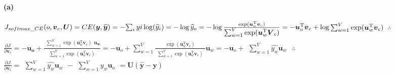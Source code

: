 \documentclass{article}
\begin{document}
\begin{spacing}{1.5}
\paragraph{(a)} 
$ J_{softmax\_CE}(o,\boldsymbol{v}_c,\boldsymbol{U})=CE(\boldsymbol{y},\boldsymbol{\widehat{y}})=-\begin{matrix} \sum_{i}y{i}\log(\widehat{y}_i)\end{matrix}=-\log\widehat{y}_o 
=-\log \frac{\exp(\boldsymbol{u}_o ^\mathrm{T}\boldsymbol{v}_c)}{\begin{matrix} \sum_{w=1}^V\exp(\boldsymbol{u}_w ^\mathrm{T}\boldsymbol{V}_c) \end{matrix}} \\
=-\boldsymbol{u}_o ^\mathrm{T}\boldsymbol{v}_c+\log \begin{matrix} \sum_{w=1}^V\exp(\boldsymbol{u}_w ^\mathrm{T}\boldsymbol{v}_c) \end{matrix} $ \newline
$ \boldsymbol{\therefore} $
$ \frac {\partial J}{\partial \boldsymbol{v}_c}=-\boldsymbol{u_o}+\frac{\begin{matrix} \sum_{w=1}^V\exp(\boldsymbol{u}_w ^\mathrm{T}\boldsymbol{v}_c) \end{matrix} \boldsymbol{u_w}}{\begin{matrix} \sum_{w=1}^V\exp(\boldsymbol{u}_w ^\mathrm{T}\boldsymbol{v}_c) \end{matrix}}
=-\boldsymbol{u}_o+\sum_{w=1}^V\frac{\exp(\boldsymbol{u}_w ^\mathrm{T}\boldsymbol{v}_c)}{\begin{matrix} \sum_{w=1}^V\exp(\boldsymbol{u}_w ^\mathrm{T}\boldsymbol{v}_c) \end{matrix}}\boldsymbol{u}_w
=-\boldsymbol{u}_o+\begin{matrix} \sum_{w=1}^V\widehat{y_w}\boldsymbol{u}_w \end{matrix} $ \newline
$ \boldsymbol{\therefore} $
$ \frac {\partial J}{\partial \boldsymbol{v}_c}= \begin{matrix} \sum_{w=1}^V\widehat{y_w}\boldsymbol{u}_w \end{matrix} - \begin{matrix} \sum_{w=1}^Vy_{w}\boldsymbol{u}_o \end{matrix}=\boldsymbol{U}(\boldsymbol{\widehat{y}}-\boldsymbol{y}) $

\end{spacing}
\end{document}
